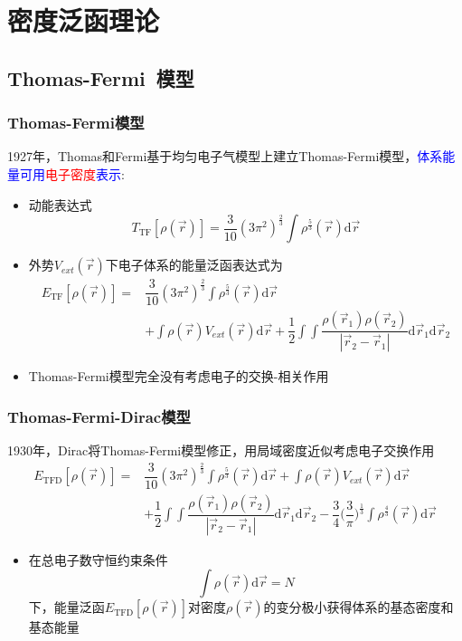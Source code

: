 \documentclass[cjk,slidestop,compress,mathserif,blue]{beamer}
\begin{document}
\section{密度泛函理论}       %
\subsection{\rm{Thomas-Fermi~}模型}       %
\frame
{
	\frametitle{\textrm{Thomas-Fermi}模型} 
	1927年，\textrm{Thomas}和\textrm{Fermi}基于均匀电子气模型上建立\textrm{Thomas-Fermi}模型，\textcolor{blue}{体系能量可用}\textcolor{red}{电子密度}\textcolor{blue}{表示}:
	\begin{itemize}
		\item 动能表达式
			$$T_{\mathrm{TF}}[\rho(\vec r)]=\dfrac3{10}(3\pi^2)^{\frac23}\int\rho^{\frac53}(\vec r)\mathrm{d}\vec r$$
		\item 外势$V_{ext}(\vec r)$下电子体系的能量泛函表达式为
			\begin{displaymath}
				\begin{aligned}
					E_{\mathrm{TF}}[\rho(\vec r)]=&\dfrac3{10}(3\pi^2)^{\frac23}\int\rho^{\frac53}(\vec r)\mathrm{d}\vec r\\
					&+\int\rho(\vec r)V_{ext}(\vec r)\mathrm{d}\vec r+\dfrac12\int\int\dfrac{\rho(\vec r_1)\rho(\vec r_2)}{|\vec r_2-\vec r_1|}\mathrm{d}\vec r_1\mathrm{d}\vec r_2
				\end{aligned}
			\end{displaymath}
		\item \textrm{Thomas-Fermi}模型完全没有考虑电子的交换-相关作用
	\end{itemize}
}

\frame
{
	\frametitle{\textrm{Thomas-Fermi-Dirac}模型} 
	1930年，\textrm{Dirac}将\textrm{Thomas-Fermi}模型修正，用局域密度近似考虑电子交换作用
			\begin{displaymath}
				\begin{aligned}
					E_{\mathrm{TFD}}[\rho(\vec r)]=&\dfrac3{10}(3\pi^2)^{\frac23}\int\rho^{\frac53}(\vec r)\mathrm{d}\vec r+\int\rho(\vec r)V_{ext}(\vec r)\mathrm{d}\vec r\\
					&+\dfrac12\int\int\dfrac{\rho(\vec r_1)\rho(\vec r_2)}{|\vec r_2-\vec r_1|}\mathrm{d}\vec r_1\mathrm{d}\vec r_2-\dfrac34\bigg(\dfrac3{\pi}\bigg)^{\frac13}\int\rho^{\frac43}(\vec r)\mathrm{d}\vec r
				\end{aligned}
			\end{displaymath}
			\begin{itemize}
				\item 在总电子数守恒约束条件
					$$\int\rho(\vec r)\mathrm{d}\vec r=N$$
					下，能量泛函$E_{\mathrm{TFD}}[\rho(\vec r)]$对密度$\rho(\vec r)$的变分极小获得体系的基态密度和基态能量
			\end{itemize}
}
\end{document}

